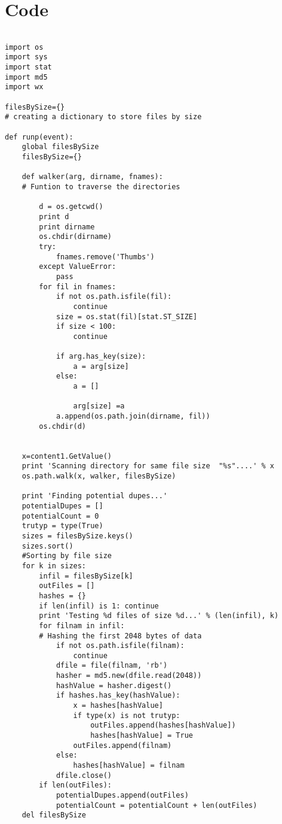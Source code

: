 \chapter{Code}
\begin{lstlisting}

import os
import sys
import stat
import md5
import wx

filesBySize={}      
# creating a dictionary to store files by size

def runp(event):
    global filesBySize
    filesBySize={} 

    def walker(arg, dirname, fnames):     
    # Funtion to traverse the directories
        
        d = os.getcwd()
        print d
        print dirname
        os.chdir(dirname)
        try:
            fnames.remove('Thumbs')
        except ValueError:
            pass        
        for fil in fnames:
            if not os.path.isfile(fil):
                continue
            size = os.stat(fil)[stat.ST_SIZE]
            if size < 100:
                continue
           
            if arg.has_key(size):
                a = arg[size]
            else:
                a = []
            
                arg[size] =a
            a.append(os.path.join(dirname, fil))
        os.chdir(d)

      
    x=content1.GetValue()
    print 'Scanning directory for same file size  "%s"....' % x
    os.path.walk(x, walker, filesBySize)    

    print 'Finding potential dupes...'
    potentialDupes = []
    potentialCount = 0
    trutyp = type(True)
    sizes = filesBySize.keys()
    sizes.sort()                                         
    #Sorting by file size
    for k in sizes:
        infil = filesBySize[k]
        outFiles = []
        hashes = {}
        if len(infil) is 1: continue
        print 'Testing %d files of size %d...' % (len(infil), k)
        for filnam in infil:                           
        # Hashing the first 2048 bytes of data
            if not os.path.isfile(filnam):
                continue
            dfile = file(filnam, 'rb')
            hasher = md5.new(dfile.read(2048))
            hashValue = hasher.digest()
            if hashes.has_key(hashValue):
                x = hashes[hashValue]
                if type(x) is not trutyp:
                    outFiles.append(hashes[hashValue])
                    hashes[hashValue] = True
                outFiles.append(filnam)
            else:
                hashes[hashValue] = filnam
            dfile.close()
        if len(outFiles):
            potentialDupes.append(outFiles)
            potentialCount = potentialCount + len(outFiles)
    del filesBySize


\end{lstlisting}
